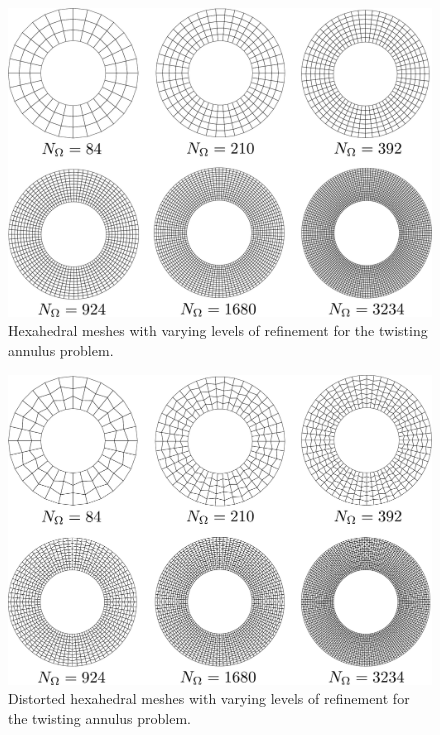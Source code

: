 \begin{figure}[!h]
  \centering
  \includegraphics[width=5.0in]{figures/hex_annulus_meshes.pdf}
  \caption{Hexahedral meshes with varying levels of refinement for the twisting annulus problem.}
  \label{fig:hex_annulus_meshes}
\end{figure}

\begin{figure}[!h]
  \centering
  \includegraphics[width=5.0in]{figures/hexp_annulus_meshes.pdf}
  \caption{Distorted hexahedral meshes with varying levels of refinement for the twisting annulus problem.}
  \label{fig:hexp_annulus_meshes}
\end{figure}

